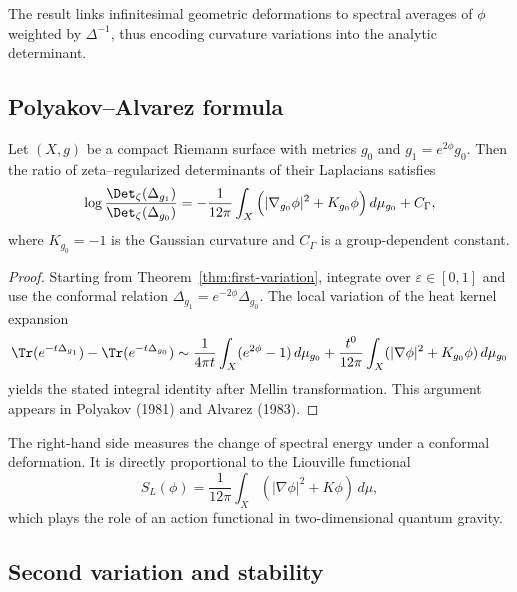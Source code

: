 \begin{remark}
The result links infinitesimal geometric deformations to spectral averages of $\phi$ weighted by $\Delta^{-1}$, thus encoding curvature variations into the analytic determinant.
\end{remark}

\subsection{Polyakov–Alvarez formula}
\label{subsec:ch4-part7-polyakov-alvarez}
\relax

\begin{theorem}
\label{thm:polyakov-alvarez}
Let $(X,g)$ be a compact Riemann surface with metrics $g_0$ and $g_1=e^{2\phi}g_0$.  
Then the ratio of zeta–regularized determinants of their Laplacians satisfies
\[
\log\frac{\Det_\zeta(\Delta_{g_1})}{\Det_\zeta(\Delta_{g_0})}
= -\frac{1}{12\pi}\int_X \Big(|\nabla_{g_0}\phi|^2 + K_{g_0}\phi\Big)\,d\mu_{g_0}
+ C_\Gamma,
\]
where $K_{g_0}=-1$ is the Gaussian curvature and $C_\Gamma$ is a group-dependent constant.
\end{theorem}

\begin{proof}\relax
Starting from Theorem~\ref{thm:first-variation}, integrate over $\varepsilon\in[0,1]$ and use the conformal relation $\Delta_{g_1}=e^{-2\phi}\Delta_{g_0}$.  
The local variation of the heat kernel expansion
\[
\Tr(e^{-t\Delta_{g_1}})-\Tr(e^{-t\Delta_{g_0}})
\sim \frac{1}{4\pi t}\int_X (e^{2\phi}-1)\,d\mu_{g_0}
+\frac{t^0}{12\pi}\int_X(|\nabla\phi|^2+K_{g_0}\phi)\,d\mu_{g_0}
\]
yields the stated integral identity after Mellin transformation.  
This argument appears in Polyakov (1981) and Alvarez (1983).
\end{proof}

\begin{remark}[Interpretation]
The right-hand side measures the change of spectral energy under a conformal deformation.  
It is directly proportional to the Liouville functional
\[
S_L(\phi)=\frac{1}{12\pi}\int_X(|\nabla\phi|^2+K\phi)\,d\mu,
\]
which plays the role of an action functional in two-dimensional quantum gravity.
\end{remark}

\subsection{Second variation and stability}
\label{subsec:ch4-part7-second-variation}
\relax

